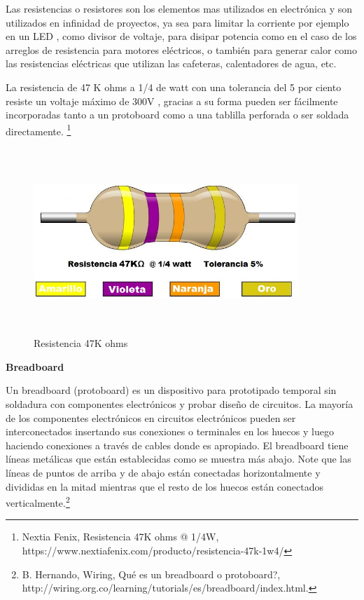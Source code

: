 \documentclass[12pt]{report}%
\begin{document}
Las resistencias o resistores son los elementos mas utilizados en electrónica y son utilizados en infinidad de proyectos, ya sea para limitar la corriente por ejemplo en un LED , como divisor de voltaje,  para disipar potencia como en el caso de los arreglos de resistencia para motores eléctricos,  o también para generar calor como las resistencias eléctricas que utilizan las cafeteras, calentadores de agua, etc.

La resistencia de 47 K ohms a 1/4 de watt con una tolerancia del 5 por ciento  resiste un voltaje máximo de 300V , gracias a su forma pueden ser fácilmente incorporadas tanto a un protoboard como a una tablilla perforada o ser soldada directamente. \footnote{Nextia Fenix, Resistencia 47K ohms @ 1/4W, https://www.nextiafenix.com/producto/resistencia-47k-1w4/}   

\begin{figure}[H]
\centering
	 \includegraphics[width=10cm, height=7cm]{resistencia.jpg}
	 \caption[Resistencia 47K ohms]{Resistencia 47K ohms}%
	 	 \label{fig:Resistencia47K}
\end{figure}

    \textbf{Breadboard}
    
 Un breadboard (protoboard) es un dispositivo para prototipado temporal sin soldadura con componentes electrónicos y probar diseño de circuitos. La mayoría de los componentes electrónicos en circuitos electrónicos pueden ser interconectados insertando sus conexiones o terminales en los huecos y luego haciendo conexiones a través de cables donde es apropiado. El breadboard tiene líneas metálicas que están establecidas como se muestra más abajo. Note que las líneas de puntos de arriba y de abajo están conectadas horizontalmente y divididas en la mitad mientras que el resto de los huecos están conectados verticalmente.\footnote{B. Hernando, Wiring, Qué es un breadboard o protoboard?, http://wiring.org.co/learning/tutorials/es/breadboard/index.html.}   
    
\end{document}
